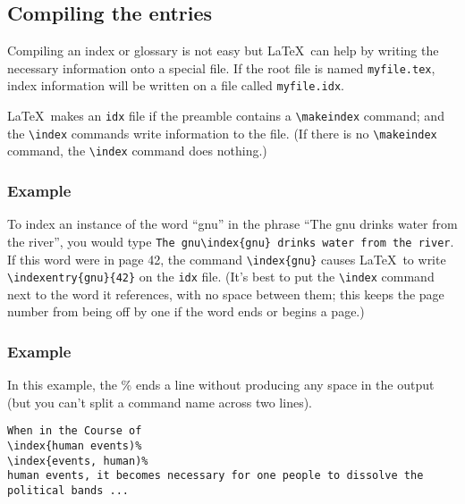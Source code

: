 \documentclass{article}
\begin{document}
\subsection{Compiling the entries}\label{compiling-entries}

Compiling an index or glossary is not easy but \LaTeX\ can help by writing the necessary information
onto a special file. If the root file is named {\tt myfile.tex}, index information will be written
on a file called {\tt myfile.idx}. 

\LaTeX\ makes an {\tt idx} file if the preamble contains a \verb:\makeindex: command; and the 
\verb:\index: commands write information to the file. 
(If there is no \verb:\makeindex: command, the \verb:\index: command does nothing.)



\subsubsection*{Example}

To index an instance of the word ``gnu'' in the phrase ``The gnu drinks water from the river'', you 
would type \verb:The gnu\index{gnu} drinks water from the river:.\\

If this word were in page 42, the command \verb:\index{gnu}: causes \LaTeX\ to
write \verb:\indexentry{gnu}{42}: on the {\tt idx} file. (It's best to put the \verb:\index:
command next to the word it references, with no space between them; this keeps the page number from
being off by one if the word ends or begins a page.)

\subsubsection*{Example}

In this example, the \% ends a line without producing any space in the output (but you can't split a
command name across two lines).
 
\begin{verbatim}
When in the Course of
\index{human events)%
\index{events, human)%
human events, it becomes necessary for one people to dissolve the political bands ...
\end{verbatim}
\end{document}
